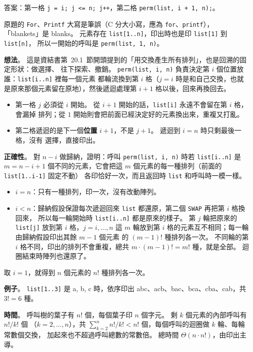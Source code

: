 \begin{pastsoln}
答案：第一格 \texttt{j = i; j <= n; j++}，第二格 \texttt{perm(list, i + 1, n);}。

原題的 \texttt{For}、\texttt{Printf} 大寫是筆誤（C 分大小寫，應為 \texttt{for}、\texttt{printf}），
「blankets」是 blanks。 元素存在 \texttt{list[1..n]}，印出時也是印 \texttt{list[1]} 到 \texttt{list[n]}，
所以一開始的呼叫是 \texttt{perm(list, 1, n)}。

\textbf{想法}。 這是資結書第~20.1~節開頭提到的「用交換產生所有排列」，也是回溯的固定形狀：做選擇、
往下探索、撤銷。 \texttt{perm(list, i, n)} 負責決定第 $i$ 個位置放誰：\texttt{list[i..n]} 裡每一個元素
都輪流換到第 $i$ 格（$j = i$ 時是和自己交換，也就是原來那個元素留在原地），然後遞迴處理第 $i + 1$
格以後，回來再換回去。
\begin{itemize}
\item 第一格 $j$ 必須從 $i$ 開始。 從 $i + 1$ 開始的話，\texttt{list[i]} 永遠不會留在第 $i$ 格，會漏掉
排列；從 $1$ 開始則會把前面已經決定好的元素換出來，重複又打亂。
\item 第二格遞迴的是下一個\textbf{位置} $i + 1$，不是 $j + 1$。 遞迴到 $i = n$ 時只剩最後一格，沒有
選擇，直接印出。
\end{itemize}

\textbf{正確性}。 對 $n - i$ 做歸納，證明：呼叫 \texttt{perm(list, i, n)} 時若 \texttt{list[i..n]} 是
$m = n - i + 1$ 個不同的元素，它會把這 $m$ 個元素的每一種排列（前面的 \texttt{list[1..i-1]} 固定不動）
各印恰好一次，而且返回時 \texttt{list} 和呼叫時一模一樣。
\begin{itemize}
\item $i = n$：只有一種排列，印一次，沒有改動陣列。
\item $i < n$：歸納假設保證每次遞迴回來 \texttt{list} 都還原，第二個 \texttt{SWAP} 再把第 $i$ 格換回來，
所以每一輪開始時 \texttt{list[i..n]} 都是原來的樣子。 第 $j$ 輪把原來的 \texttt{list[j]} 放到第 $i$
格，$j = i, \ldots, n$ 這 $m$ 輪放到第 $i$ 格的元素互不相同；每一輪由歸納假設印出其餘 $m - 1$ 個元素
的 $(m - 1)!$ 種排列各一次。 不同輪的第 $i$ 格不同，印出的排列不會重複，總共
$m \cdot (m - 1)! = m!$ 種，就是全部。 迴圈結束時陣列也還原了。
\end{itemize}
取 $i = 1$，就得到 $n$ 個元素的 $n!$ 種排列各一次。

\textbf{例子}。 \texttt{list[1..3]} 是 a, b, c 時，依序印出 abc、acb、bac、bca、cba、cab，共 $3! = 6$ 種。

\textbf{時間}。 呼叫樹的葉子有 $n!$ 個，每個葉子印 $n$ 個字元。 剩 $k$ 個元素的內部呼叫有 $n!/k!$ 個
（$k = 2, \ldots, n$），共 $\sum_{k=2}^{n} n!/k! < n!$ 個，每個呼叫的迴圈做 $k$ 輪、每輪常數個交換，
加起來也不超過呼叫總數的常數倍。 總時間 $\Theta(n \cdot n!)$，由印出主導。
\end{pastsoln}
